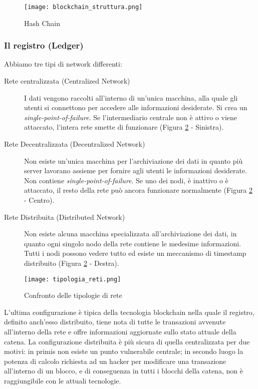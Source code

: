 \begin{figure}[htbp]
  \centering
  \texttt{[image: blockchain\_struttura.png]}
  \caption{Hash Chain}
  \label{fig:hash_chain}
\end{figure}

\subsubsection{Il registro (Ledger)}
Abbiamo tre tipi di network differenti:
\begin{description}
  \item[Rete centralizzata (Centralized Network)] I dati vengono raccolti all'interno di un'unica macchina, alla quale gli utenti si connettono per accedere alle informazioni desiderate. Si crea un \textit{single-point-of-failure}. Se l'intermediario centrale non è attivo o viene attaccato, l'intera rete smette di funzionare (Figura \ref{fig:tipologie_reti} - Sinistra).
  \item[Rete Decentralizzata (Decentralized Network)] Non esiste un'unica macchina per l'archiviazione dei dati in quanto più server lavorano assieme per fornire agli utenti le informazioni desiderate. Non contiene \textit{single-point-of-failure}. Se uno dei nodi, è inattivo o è attaccato, il resto della rete può ancora funzionare normalmente (Figura \ref{fig:tipologie_reti} - Centro).
  \item[Rete Distribuita (Distributed Network)] Non esiste alcuna macchina specializzata all'archiviazione dei dati, in quanto ogni singolo nodo della rete contiene le medesime informazioni. Tutti i nodi possono vedere tutto ed esiste un meccanismo di timestamp distribuito (Figura \ref{fig:tipologie_reti} - Destra).
\end{description}

\begin{figure}[htbp]
  \centering
  \texttt{[image: tipologia\_reti.png]}
  \caption{Confronto delle tipologie di rete}
  \label{fig:tipologie_reti}
\end{figure}

L'ultima configurazione è tipica della tecnologia blockchain nella quale il registro, definito anch'esso distribuito, tiene nota di tutte le transazioni avvenute all'interno della rete e offre informazioni aggiornate sullo stato attuale della catena. La configurazione distribuita è più sicura di quella centralizzata per due motivi: in primis non esiste un punto vulnerabile centrale; in secondo luogo la potenza di calcolo richiesta ad un hacker per modificare una transazione all'interno di un blocco, e di conseguenza in tutti i blocchi della catena, non è raggiungibile con le attuali tecnologie.

